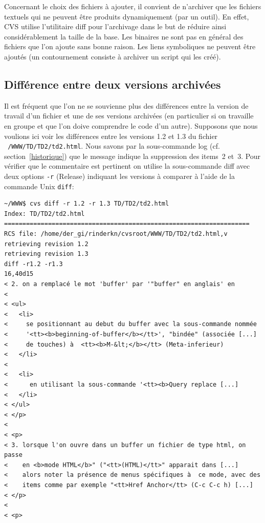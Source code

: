 \documentclass[11pt,a4paper]{article}
\begin{document}
Concernant le choix des fichiers à ajouter, il convient de n'archiver
que les fichiers textuels qui ne peuvent être produits dynamiquement
(par un outil). En effet, CVS utilise l'utilitaire \textsf{diff} pour
l'archivage dans le but de réduire ainsi considérablement la taille de
la base. Les binaires ne sont pas en général des fichiers que l'on
ajoute sans bonne raison. Les liens symboliques ne peuvent être
ajoutés (un contournement consiste à archiver un script qui les créé).





\subsection{Différence entre deux versions archivées}

Il est fréquent que l'on ne se souvienne plus des différences entre la
version de travail d'un fichier et une de ses versions archivées (en
particulier si on travaille en groupe et que l'on doive comprendre le
code d'un autre). Supposons que nous voulions ici voir les différences
entre les versions 1.2 et 1.3 du fichier
\texttt{~/WWW/TD/TD2/td2.html}. Nous savons par la sous-commande
\textsf{log} (cf. section~\ref{historique}) que le message indique la
suppression des items~2 et~3. Pour vérifier que le commentaire est
pertinent on utilise la sous-commande \textsf{diff} avec deux options
\texttt{-r} (\textsf{Release}) indiquant les versions à comparer à
l'aide de la commande Unix \texttt{diff}:

{\small
\begin{verbatim}
~/WWW$ cvs diff -r 1.2 -r 1.3 TD/TD2/td2.html
Index: TD/TD2/td2.html
===================================================================
RCS file: /home/der_gi/rinderkn/cvsroot/WWW/TD/TD2/td2.html,v
retrieving revision 1.2
retrieving revision 1.3
diff -r1.2 -r1.3
16,40d15
< 2. on a remplacé le mot 'buffer' par '"buffer" en anglais' en
<
< <ul>
<   <li>
<     se positionnant au debut du buffer avec la sous-commande nommée
<     '<tt><b>beginning-of-buffer</b></tt>', "bindée" (associée [...]
<     de touches) à  <tt><b>M-&lt;</b></tt> (Meta-inferieur)
<   </li>
<
<   <li>
<      en utilisant la sous-commande '<tt><b>Query replace [...]
<   </li>
< </ul>
< </p>
<
< <p>
< 3. lorsque l'on ouvre dans un buffer un fichier de type html, on passe
<    en <b>mode HTML</b>" ("<tt>(HTML)</tt>" apparait dans [...]
<    alors noter la présence de menus spécifiques à  ce mode, avec des
<    items comme par exemple "<tt>Href Anchor</tt> (C-c C-c h) [...]
< </p>
<
< <p>
\end{verbatim}
}
\end{document}
